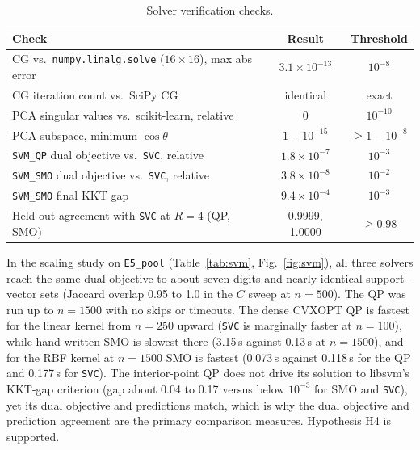 \documentclass[conference,a4paper]{IEEEtran}
\begin{document}
\begin{table}[!tb]
\centering
\caption{Solver verification checks.}
\label{tab:verify}
\footnotesize
\begin{tabular}{@{}lcc@{}}
\toprule
Check & Result & Threshold\\
\midrule
CG vs.\ \texttt{numpy.linalg.solve} ($16\times16$), max abs error & $3.1\times10^{-13}$ & $10^{-8}$\\
CG iteration count vs.\ SciPy CG & identical & exact\\
PCA singular values vs.\ scikit-learn, relative & 0 & $10^{-10}$\\
PCA subspace, minimum $\cos\theta$ & $1-10^{-15}$ & $\ge1-10^{-8}$\\
\texttt{SVM\_QP} dual objective vs.\ \texttt{SVC}, relative & $1.8\times10^{-7}$ & $10^{-3}$\\
\texttt{SVM\_SMO} dual objective vs.\ \texttt{SVC}, relative & $3.8\times10^{-8}$ & $10^{-2}$\\
\texttt{SVM\_SMO} final KKT gap & $9.4\times10^{-4}$ & $10^{-3}$\\
Held-out agreement with \texttt{SVC} at $R=4$ (QP, SMO) & 0.9999, 1.0000 & $\ge0.98$\\
\bottomrule
\end{tabular}
\end{table}

In the scaling study on \texttt{E5\_pool} (Table~\ref{tab:svm}, Fig.~\ref{fig:svm}), all three solvers reach the same dual objective to about seven digits and nearly identical support-vector sets (Jaccard overlap 0.95 to 1.0 in the $C$ sweep at $n=500$). The QP was run up to $n=1500$ with no skips or timeouts. The dense CVXOPT QP is fastest for the linear kernel from $n=250$ upward (\texttt{SVC} is marginally faster at $n=100$), while hand-written SMO is slowest there (3.15\,s against 0.13\,s at $n=1500$), and for the RBF kernel at $n=1500$ SMO is fastest (0.073\,s against 0.118\,s for the QP and 0.177\,s for \texttt{SVC}). The interior-point QP does not drive its solution to libsvm's KKT-gap criterion (gap about 0.04 to 0.17 versus below $10^{-3}$ for SMO and \texttt{SVC}), yet its dual objective and predictions match, which is why the dual objective and prediction agreement are the primary comparison measures. Hypothesis H4 is supported.
\end{document}
